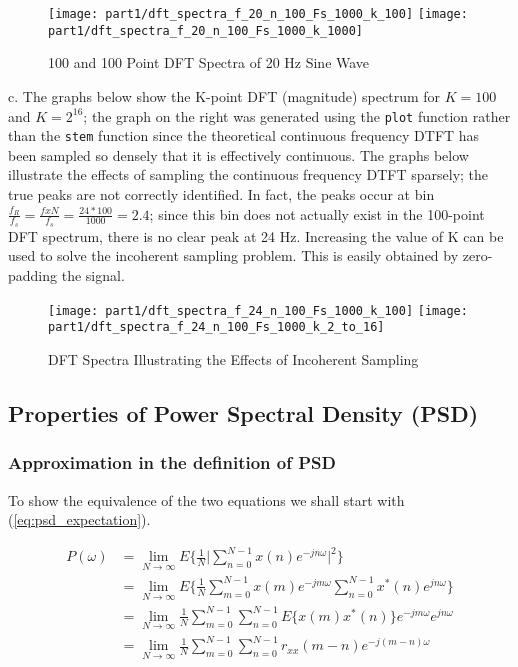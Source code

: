 \begin{figure}[H]
\centering{}
\texttt{[image: part1/dft\_spectra\_f\_20\_n\_100\_Fs\_1000\_k\_100]}
\texttt{[image: part1/dft\_spectra\_f\_20\_n\_100\_Fs\_1000\_k\_1000]}
\label{fig:dft_spectra_f_20}
\caption{100 and 100 Point DFT Spectra of 20 Hz Sine Wave}
\end{figure}

\noindent{}c. The graphs below show the K-point DFT (magnitude) spectrum for $K=100$ and $K=2^{16}$; the graph on the right was generated using the \texttt{plot} function rather than the \texttt{stem} function since the theoretical continuous frequency DTFT has been sampled so densely that it is effectively continuous. The graphs below illustrate the effects of sampling the continuous frequency DTFT sparsely; the true peaks are not correctly identified. In fact, the peaks occur at bin $\frac{f_{R}}{f_{s}}=\frac{f x N}{f_{s}}=\frac{24*100}{1000}=2.4$; since this bin does not actually exist in the 100-point DFT spectrum, there is no clear peak at 24 Hz. Increasing the value of K can be used to solve the incoherent sampling problem. This is easily obtained by zero-padding the signal.

\begin{figure}[H]
\centering{}
\texttt{[image: part1/dft\_spectra\_f\_24\_n\_100\_Fs\_1000\_k\_100]}
\texttt{[image: part1/dft\_spectra\_f\_24\_n\_100\_Fs\_1000\_k\_2\_to\_16]}
\caption{DFT Spectra Illustrating the Effects of Incoherent Sampling}
\end{figure}

\subsection{Properties of Power Spectral Density (PSD)}

\subsubsection*{Approximation in the definition of PSD}

\noindent{}To show the equivalence of the two equations we shall start with (\ref{eq:psd_expectation}).

\begin{align}
P(\omega)	&=\lim_{N \to \infty} E \Bigg\{ \frac{1}{N} \Bigg\lvert\sum_{n=0}^{N-1} x(n)e^{-jn\omega}\Bigg\rvert^{2} \Bigg\} \label{eq:psd_expectation} \\
			&=\lim_{N \to \infty} E \Bigg\{ \frac{1}{N} \sum_{m=0}^{N-1} x(m)e^{-jm\omega}\sum_{n=0}^{N-1} x^{*}(n)e^{jn\omega} \Bigg\} \nonumber \\
			&=\lim_{N \to \infty} \frac{1}{N} \sum_{m=0}^{N-1} \sum_{n=0}^{N-1} E \Bigg\{x(m)x^{*}(n)\Bigg\} e^{-jm\omega}e^{jn\omega} \nonumber \\
			&=\lim_{N \to \infty} \frac{1}{N} \sum_{m=0}^{N-1} \sum_{n=0}^{N-1} r_{xx}(m-n) e^{-j(m-n)\omega} \nonumber			
\end{align}

